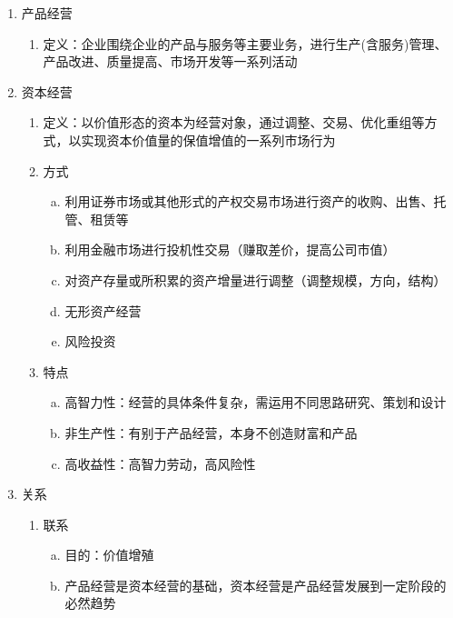 \documentclass[12pt]{book}
\begin{document}
\begin{enumerate}[1.]
    \item 产品经营
          \begin{enumerate}[(1)]
              \item 定义：企业围绕企业的产品与服务等主要业务，进行生产(含服务)管理、产品改进、质量提高、市场开发等一系列活动
          \end{enumerate}
    \item 资本经营
          \begin{enumerate}[(1)]
              \item 定义：以价值形态的资本为经营对象，通过调整、交易、优化重组等方式，以实现资本价值量的保值增值的一系列市场行为
              \item 方式
                    \begin{enumerate}[a.]
                        \item 利用证券市场或其他形式的产权交易市场进行资产的收购、出售、托管、租赁等
                        \item 利用金融市场进行投机性交易（赚取差价，提高公司市值）
                        \item 对资产存量或所积累的资产增量进行调整（调整规模，方向，结构）
                        \item 无形资产经营
                        \item 风险投资
                    \end{enumerate}
              \item 特点
                    \begin{enumerate}[a.]
                        \item 高智力性：经营的具体条件复杂，需运用不同思路研究、策划和设计
                        \item 非生产性：有别于产品经营，本身不创造财富和产品
                        \item 高收益性：高智力劳动，高风险性
                    \end{enumerate}
          \end{enumerate}
    \item 关系
          \begin{enumerate}[(1)]
              \item 联系
                    \begin{enumerate}[a.]
                        \item 目的：价值增殖
                        \item 产品经营是资本经营的基础，资本经营是产品经营发展到一定阶段的必然趋势

\end{enumerate}
\end{enumerate}
\end{enumerate}
\end{document}

